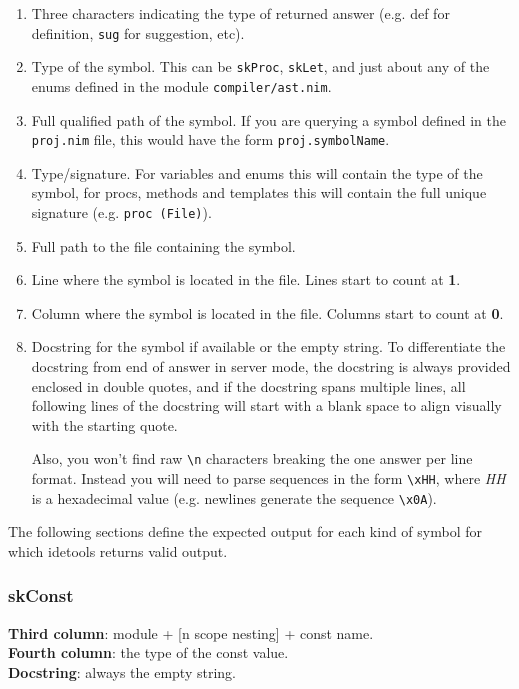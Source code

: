 \begin{enumerate}
\def\labelenumi{\arabic{enumi}.}
\item
  Three characters indicating the type of returned answer (e.g. def for
  definition, \texttt{sug} for suggestion, etc).
\item
  Type of the symbol. This can be \texttt{skProc}, \texttt{skLet}, and
  just about any of the enums defined in the module
  \texttt{compiler/ast.nim}.
\item
  Full qualified path of the symbol. If you are querying a symbol
  defined in the \texttt{proj.nim} file, this would have the form
  \texttt{proj.symbolName}.
\item
  Type/signature. For variables and enums this will contain the type of
  the symbol, for procs, methods and templates this will contain the
  full unique signature (e.g. \texttt{proc\ (File)}).
\item
  Full path to the file containing the symbol.
\item
  Line where the symbol is located in the file. Lines start to count at
  \textbf{1}.
\item
  Column where the symbol is located in the file. Columns start to count
  at \textbf{0}.
\item
  Docstring for the symbol if available or the empty string. To
  differentiate the docstring from end of answer in server mode, the
  docstring is always provided enclosed in double quotes, and if the
  docstring spans multiple lines, all following lines of the docstring
  will start with a blank space to align visually with the starting
  quote.

  Also, you won't find raw \texttt{\textbackslash{}n} characters
  breaking the one answer per line format. Instead you will need to
  parse sequences in the form \texttt{\textbackslash{}xHH}, where
  \emph{HH} is a hexadecimal value (e.g. newlines generate the sequence
  \texttt{\textbackslash{}x0A}).
\end{enumerate}

The following sections define the expected output for each kind of
symbol for which idetools returns valid output.

\hypertarget{skconst}{%
\subsubsection{skConst}\label{skconst}}

\textbf{Third column}: module + {[}n scope nesting{]} + const name.\\
\textbf{Fourth column}: the type of the const value.\\
\textbf{Docstring}: always the empty string.

